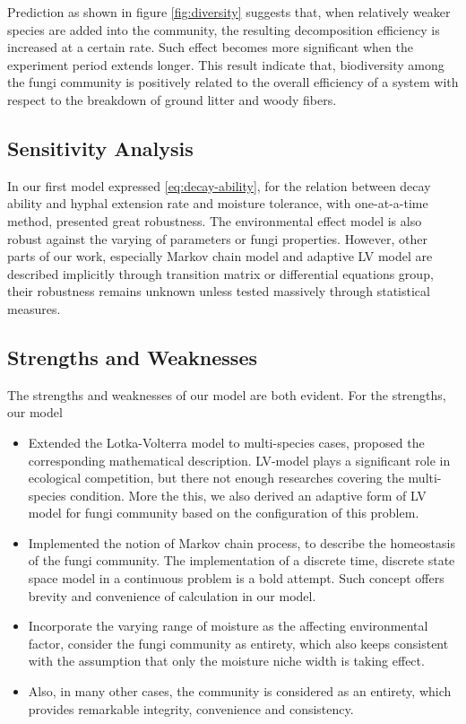 Prediction as shown in figure \ref{fig:diversity} suggests that, when relatively weaker species are added into the community, the resulting decomposition efficiency is increased at a certain rate. Such effect becomes more significant when the experiment period extends longer. This result indicate that, biodiversity among the fungi community is positively related to the overall efficiency of a system with respect to the breakdown of ground litter and woody fibers.


\subsection{Sensitivity Analysis}

In our first model expressed \eqref{eq:decay-ability}, for the relation between decay ability and hyphal extension rate and moisture tolerance, with one-at-a-time method, presented great robustness. The environmental effect model is also robust against the varying of parameters or fungi properties. However, other parts of our work, especially Markov chain model and adaptive LV model are described implicitly through transition matrix or differential equations group, their robustness remains unknown unless tested massively through statistical measures.


\subsection{Strengths and Weaknesses}

The strengths and weaknesses of our model are both evident. For the strengths, our model

\begin{itemize}
    \item Extended the Lotka-Volterra model to multi-species cases, proposed the corresponding mathematical description. LV-model plays a significant role in ecological competition, but there not enough researches covering the multi-species condition. More the this, we also derived an adaptive form of LV model for fungi community based on the configuration of this problem.
    \item Implemented the notion of Markov chain process, to describe the homeostasis of the fungi community. The implementation of a discrete time, discrete state space model in a continuous problem is a bold attempt. Such concept offers brevity and convenience of calculation in our model.
    \item Incorporate the varying range of moisture as the affecting environmental factor, consider the fungi community as entirety, which also keeps consistent with the assumption that only the moisture niche width is taking effect.
    \item Also, in many other cases, the community is considered as an entirety, which provides remarkable integrity, convenience and consistency.
\end{itemize}

